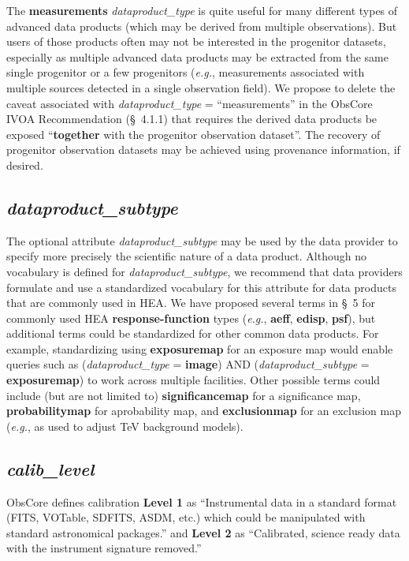 \documentclass[11pt,a4paper]{ivoa}
\begin{document}
The {\bf measurements} {\em dataproduct\_type\/} is quite useful for many different types of advanced data products (which may be derived from multiple observations). But users of those products often may not be interested in the progenitor datasets, especially as multiple advanced data products may be extracted from the same single progenitor or a few progenitors ({\em e.g.\/}, measurements associated with multiple sources detected in a single observation field). We propose to delete the caveat associated with {\em dataproduct\_type\/} = ``measurements'' in the ObsCore IVOA Recommendation (\S~4.1.1) that requires the derived data products be exposed ``{\bf together} with the progenitor observation dataset''.  The recovery of progenitor observation datasets may be achieved using provenance information, if desired.

\subsection{{\em dataproduct\_subtype}}

The optional attribute {\em dataproduct\_subtype} may be used by the data provider to specify more precisely the scientific nature of a data product.  Although no vocabulary is defined for {\em dataproduct\_subtype\/}, we recommend that data providers formulate and use a standardized vocabulary for this attribute for data products that are commonly used in \gls{HEA}\null.  We have proposed several terms in \S~5 for commonly used \gls{HEA} {\bf response-function} types ({\em e.g.\/}, {\bf aeff}, {\bf edisp}, {\bf psf}), but additional terms could be standardized for other common data products.  For example, standardizing using {\bf exposuremap} for an exposure map would enable queries such as  ({\em dataproduct\_type\/} = {\bf image}) AND ({\em dataproduct\_subtype\/} = {\bf exposuremap}) to work across multiple facilities.  Other possible terms could include (but are not limited to) {\bf significancemap} for a significance map, {\bf probabilitymap} for aprobability map, and {\bf exclusionmap} for an exclusion map ({\em e.g.\/}, as used to adjust TeV background models).

\subsection{{\em calib\_level}}

ObsCore defines calibration {\bf Level 1} as ``Instrumental data in a standard format (FITS, VOTable, SDFITS, ASDM, etc.) which could be manipulated with standard astronomical packages.'' and {\bf Level 2} as ``Calibrated, science ready data with the instrument signature removed.''
\end{document}
